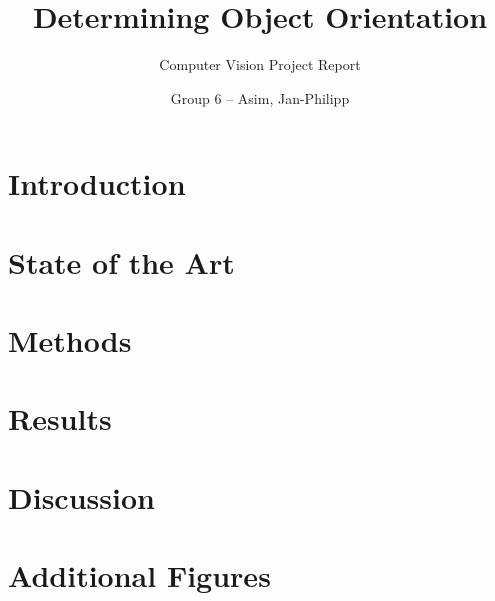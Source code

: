 \documentclass[11pt,a4paper,oneside]{scrartcl}
\title{Determining Object Orientation}
\subtitle{Computer Vision Project Report}
\author{Group 6 -- Asim, Jan-Philipp}
\begin{document}
    \maketitle


    \section{Introduction}
    \label{sec:introduction}
    


    \section{State of the Art}
    \label{sec:state_of_the_art}
    


    \section{Methods}
    \label{sec:methods}
    


    \section{Results}
    \label{sub:results}
    


    \section{Discussion}
    \label{sec:approach}
    

    \nocite{*}
    \printbibliography

    \appendix
    \renewcommand{\thefigure}{A.\arabic{figure}}


    \section{Additional Figures}
    
\end{document}
